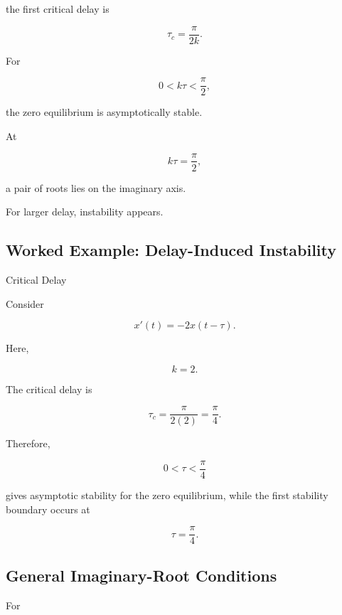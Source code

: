 the first critical delay is

\[
\boxed{
\tau_c
=
\frac{
\pi
}{
2k
}.
}
\]

For

\[
\boxed{
0<k\tau<\frac{\pi}{2},
}
\]

the zero equilibrium is asymptotically stable.

At

\[
\boxed{
k\tau=\frac{\pi}{2},
}
\]

a pair of roots lies on the imaginary axis.

For larger delay, instability appears.

\subsection{Worked Example: Delay-Induced Instability}
\label{subsec:worked-delay-instability}

\begin{workedexamplebox}{Critical Delay}

Consider

\[
x'(t)
=
-2x(t-\tau).
\]

Here,

\[
k=2.
\]

The critical delay is

\[
\tau_c
=
\frac{
\pi
}{
2(2)
}
=
\frac{\pi}{4}.
\]

Therefore,

\begin{answerbox}
\[
\boxed{
0<\tau<\frac{\pi}{4}
}
\]

gives asymptotic stability for the zero equilibrium, while the first
stability boundary occurs at

\[
\boxed{
\tau=\frac{\pi}{4}.
}
\]
\end{answerbox}

\end{workedexamplebox}

\subsection{General Imaginary-Root Conditions}
\label{subsec:general-dde-imaginary-root-conditions}

For

